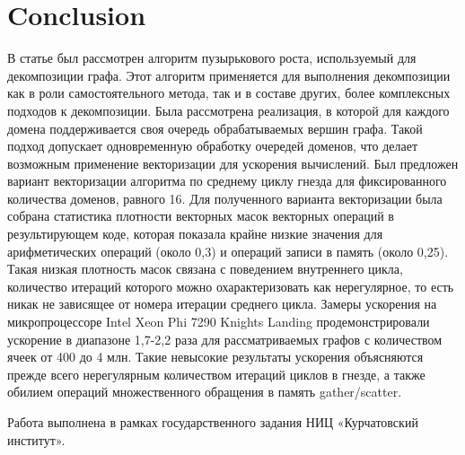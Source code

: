 \documentclass[
11pt,%
tightenlines,%
twoside,%
onecolumn,%
nofloats,%
nobibnotes,%
nofootinbib,%
superscriptaddress,%
noshowpacs,%
centertags]%
{revtex4}
\begin{document}
\section{Conclusion}

В статье был рассмотрен алгоритм пузырькового роста, используемый для декомпозиции графа.
Этот алгоритм применяется для выполнения декомпозиции как в роли самостоятельного метода, так и в составе других, более комплексных подходов к декомпозиции.
Была рассмотрена реализация, в которой для каждого домена поддерживается своя очередь обрабатываемых вершин графа.
Такой подход допускает одновременную обработку очередей доменов, что делает возможным применение векторизации для ускорения вычислений.
Был предложен вариант векторизации алгоритма по среднему циклу гнезда для фиксированного количества доменов, равного 16.
Для полученного варианта векторизации была собрана статистика плотности векторных масок векторных операций в результирующем коде, которая показала крайне низкие значения для арифметических операций (около 0,3) и операций записи в память (около 0,25).
Такая низкая плотность масок связана с поведением внутреннего цикла, количество итераций которого можно охарактеризовать как нерегулярное, то есть никак не зависящее от номера итерации среднего цикла.
Замеры ускорения на микропроцессоре Intel Xeon Phi 7290 Knights Landing продемонстрировали ускорение в диапазоне 1,7-2,2 раза для рассматриваемых графов с количеством ячеек от 400 до 4 млн.
Такие невысокие результаты ускорения объясняются прежде всего нерегулярным количеством итераций циклов в гнезде, а также обилием операций множественного обращения в память gather/scatter.

\begin{acknowledgments}
Работа выполнена в рамках государственного задания НИЦ «Курчатовский институт».
\end{acknowledgments}

%
%
\end{document}
